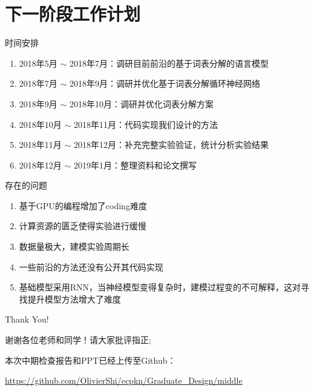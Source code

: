 \documentclass[14pt]{Bredelebeamer}
\begin{document}
\section{下一阶段工作计划}
\begin{frame}{时间安排}
	\begin{block}{}
\begin{enumerate}
  \item 2018年5月 $\sim$ 2018年7月：调研目前前沿的基于词表分解的语言模型
  \item 2018年7月 $\sim$ 2018年9月：调研并优化基于词表分解循环神经网络
  \item 2018年9月 $\sim$ 2018年10月：调研并优化词表分解方案
  \item 2018年10月 $\sim$ 2018年11月：代码实现我们设计的方法
  \item 2018年11月 $\sim$ 2018年12月：补充完整实验验证，统计分析实验结果
  \item 2018年12月 $\sim$ 2019年1月：整理资料和论文撰写
\end{enumerate}
    \end{block}
\end{frame}

\begin{frame}{存在的问题}
\begin{block}{}
\begin{enumerate}
  \item 基于GPU的编程增加了coding难度
  \item 计算资源的匮乏使得实验进行缓慢
  \item 数据量极大，建模实验周期长
  \item 一些前沿的方法还没有公开其代码实现
  \item 基础模型采用RNN，当神经模型变得复杂时，建模过程变的不可解释，这对寻找提升模型方法增大了难度
\end{enumerate}
\end{block}
\end{frame}

\begin{frame}
	\centering
    \Huge Thank You!

    \small

    谢谢各位老师和同学！请大家批评指正;

	本次中期检查报告和PPT已经上传至Github：

    \url{https://github.com/OlivierShi/ecpkn/Graduate_Design/middle}
	
\end{frame}
\end{document}
